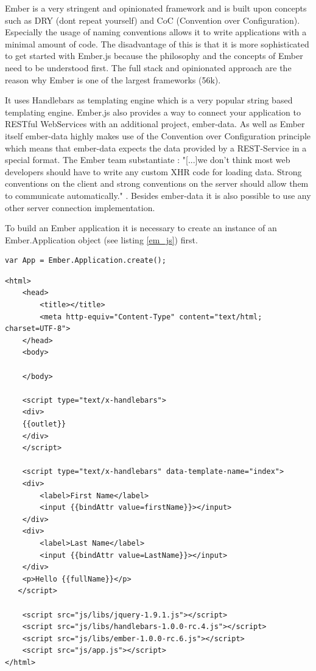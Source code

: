 Ember is a very stringent and opinionated framework and is built upon concepts such as DRY (dont repeat yourself) and CoC (Convention over Configuration).
Especially the usage of naming conventions allows it to write applications with a minimal amount of code.
The disadvantage of this is that it is more sophisticated to get started with Ember.js because the philosophy and the concepts of Ember need to be understood first.
The full stack and opinionated approach are the reason why Ember is one of the largest frameworks (56k).

It uses Handlebars as templating engine which is a very popular string based templating engine.
Ember.js also provides a way to connect your application to RESTful WebServices with an additional project, ember-data.
As well as Ember itself ember-data highly makes use of the Convention over Configuration principle which means that ember-data expects the data provided by a REST-Service in a special format.
The Ember team substantiate : "[...]we don't think most web developers should have to write any custom XHR code for loading data.
Strong conventions on the client and strong conventions on the server should allow them to communicate automatically." \autocite{tech-ana:ember-data}.
Besides ember-data it is also possible to use any other server connection implementation.

To build an Ember application it is necessary to create an instance of an Ember.Application object (see listing \ref{em_js}) first.
\begin{lstlisting}[label=em_js, caption=app.js]
var App = Ember.Application.create();
\end{lstlisting}

\begin{lstlisting}[label=em_html,caption=index.html]
<html>
    <head>
        <title></title>
        <meta http-equiv="Content-Type" content="text/html; charset=UTF-8">
    </head>
    <body>

    </body>
    
    <script type="text/x-handlebars">
	<div>
	{{outlet}}
	</div>
    </script>

    <script type="text/x-handlebars" data-template-name="index">
	<div>
		<label>First Name</label> 
		<input {{bindAttr value=firstName}}></input>
	</div>
	<div>
		<label>Last Name</label> 
		<input {{bindAttr value=LastName}}></input>
	</div>
	<p>Hello {{fullName}}</p>
   </script>

    <script src="js/libs/jquery-1.9.1.js"></script>
    <script src="js/libs/handlebars-1.0.0-rc.4.js"></script>
    <script src="js/libs/ember-1.0.0-rc.6.js"></script>
    <script src="js/app.js"></script>
</html>
\end{lstlisting}

